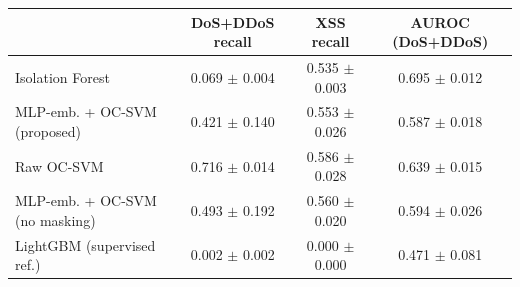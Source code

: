 \begin{tabular}{lccc}
\toprule
 & DoS+DDoS recall & XSS recall & AUROC (DoS+DDoS) \\
\midrule
Isolation Forest & 0.069 $\pm$ 0.004 & 0.535 $\pm$ 0.003 & 0.695 $\pm$ 0.012 \\
MLP-emb. + OC-SVM (proposed) & 0.421 $\pm$ 0.140 & 0.553 $\pm$ 0.026 & 0.587 $\pm$ 0.018 \\
Raw OC-SVM & 0.716 $\pm$ 0.014 & 0.586 $\pm$ 0.028 & 0.639 $\pm$ 0.015 \\
MLP-emb. + OC-SVM (no masking) & 0.493 $\pm$ 0.192 & 0.560 $\pm$ 0.020 & 0.594 $\pm$ 0.026 \\
LightGBM (supervised ref.) & 0.002 $\pm$ 0.002 & 0.000 $\pm$ 0.000 & 0.471 $\pm$ 0.081 \\
\bottomrule
\end{tabular}